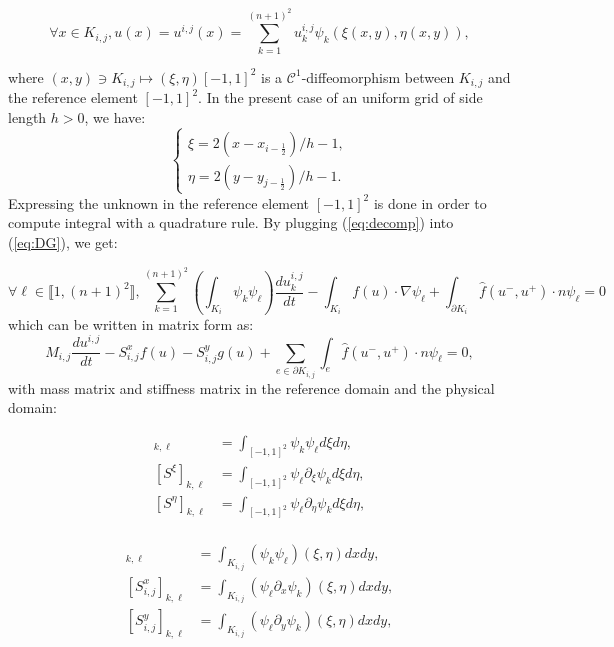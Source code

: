 \documentclass[10pt]{article}
\begin{document}
\begin{equation}\label{eq:decomp}
  \forall x\in K_{i,j}, u(x) = u^{i,j}(x) = \sum_{k=1}^{(n+1)^2} u_k^{i,j}\psi_k(\xi(x,y), \eta(x,y)),
\end{equation}

where \((x,y)\ni K_{i,j} \longmapsto (\xi, \eta) [-1,1]^2\) is a \(\mathcal{C}^1\)-diffeomorphism between \(K_{i,j}\) and the reference element \([-1,1]^2\). In the present case of an uniform grid of side length \(h>0\), we have:
\begin{equation}\label{eq:transformation}
  \begin{cases}
    \xi = 2(x-x_{i-\frac12})/h-1, \\
    \eta = 2(y-y_{j-\frac12})/h-1.
  \end{cases}
\end{equation}
Expressing the unknown in the reference element \([-1,1]^2\) is done in order to compute integral with a quadrature rule. By plugging (\ref{eq:decomp}) into (\ref{eq:DG}), we get:

\[\forall \ell\in \llbracket 1, (n+1)^2\rrbracket, \sum_{k=1}^{(n+1)^2}\left(\int_{K_i} \psi_k\psi_\ell\right) \frac{du_k^{i,j}}{dt} - \int_{K_i} f(u)\cdot\nabla\psi_\ell + \int_{\partial K_i} \widehat{f}(u^-, u^+)\cdot n\psi_\ell = 0\]
which can be written in matrix form as:
\[M_{i,j}\frac{du^{i,j}}{dt} - S_{i,j}^xf(u) - S_{i,j}^yg(u) + \sum_{e\in\partial K_{i,j}}\int_e\widehat{f}(u^-, u^+)\cdot n\psi_\ell = 0,\]
with mass matrix and stiffness matrix in the reference domain and the physical domain:

\begin{minipage}{.49\linewidth}
  \centering
  \begin{align*}
  [M]_{k,\ell} &= \int_{[-1,1]^2}\psi_k\psi_\ell d\xi d\eta, \\
  [S^\xi]_{k,\ell} &= \int_{[-1,1]^2}\psi_\ell\partial_\xi\psi_kd\xi d\eta, \\
  [S^\eta]_{k,\ell} &= \int_{[-1,1]^2}\psi_\ell\partial_\eta\psi_kd\xi d\eta, \\
  \end{align*}
\end{minipage}%
\begin{minipage}{.49\linewidth}
  \centering
  \begin{align*}
  [M_{i,j}]_{k,\ell} &= \int_{K_{i,j}}(\psi_k\psi_\ell)(\xi,\eta)dxdy, \\
  [S_{i,j}^x]_{k,\ell} &= \int_{K_{i,j}}(\psi_\ell\partial_x\psi_k)(\xi,\eta) dxdy, \\
  [S_{i,j}^y]_{k,\ell} &= \int_{K_{i,j}}(\psi_\ell\partial_y\psi_k)(\xi,\eta) dxdy, \\
  \end{align*}
\end{minipage}
\end{document}

